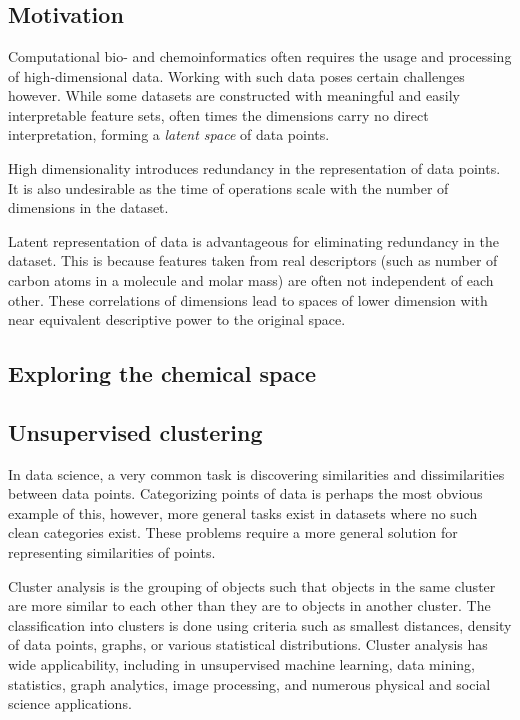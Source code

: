 \chapter{\bevezetes}

\section{Motivation}

Computational bio- and chemoinformatics often requires the usage and processing of high-dimensional data. Working with such data poses certain challenges however. While some datasets are constructed with meaningful and easily interpretable feature sets, often times the dimensions carry no direct interpretation, forming a \textit{latent space} of data points.

High dimensionality introduces redundancy in the representation of data points. It is also undesirable as the time of operations scale with the number of dimensions in the dataset.

Latent representation of data is advantageous for eliminating redundancy in the dataset. This is because features taken from real descriptors (such as number of carbon atoms in a molecule and molar mass) are often not independent of each other. These correlations of dimensions lead to spaces of lower dimension with near equivalent descriptive power to the original space. 

\section{Exploring the chemical space}



\section{Unsupervised clustering}

In data science, a very common task is discovering similarities and dissimilarities between data points. Categorizing points of data is perhaps the most obvious example of this, however, more general tasks exist in datasets where no such clean categories exist. These problems require a more general solution for representing similarities of points.

Cluster analysis is the grouping of objects such that objects in the same cluster are more similar to each other than they are to objects in another cluster. The classification into clusters is done using criteria such as smallest distances, density of data points, graphs, or various statistical distributions. Cluster analysis has  wide applicability, including in unsupervised machine learning, data mining, statistics, graph analytics,  image processing, and numerous physical and social science applications.

